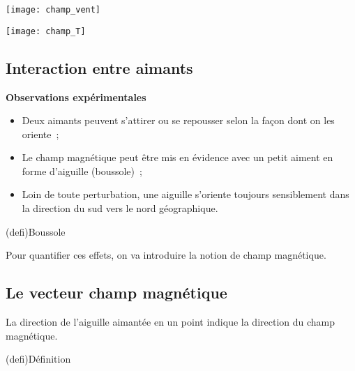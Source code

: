 \documentclass[../../main/main.tex]{subfiles}
\begin{document}
\noindent
\begin{minipage}[t]{.5\linewidth}
	\centering
	\texttt{[image: champ\_vent]}
	\label{fig:chpvent}
\end{minipage}
\hfill
\begin{minipage}[t]{.5\linewidth}
	\centering
	\texttt{[image: champ\_T]}
	\label{fig:chpT}
\end{minipage}

\subsection{Interaction entre aimants}
\textbf{Observations expérimentales}
\begin{itemize}
	\item Deux aimants peuvent s'attirer ou se repousser selon la façon dont on
	      les oriente~;
	\item Le champ magnétique peut être mis en évidence avec un petit aiment en
	      forme d'aiguille (boussole)~;
	\item Loin de toute perturbation, une aiguille s'oriente toujours sensiblement
	      dans la direction du sud vers le nord géographique.
\end{itemize}
\begin{tcb}(defi){Boussole}
	\begin{center}
	\end{center}
\end{tcb}
Pour quantifier ces effets, on va introduire la notion de champ magnétique.

\subsection{Le vecteur champ magnétique}
La direction de l'aiguille aimantée en un point indique la direction du champ
magnétique.
\begin{tcb}(defi){Définition}
\end{tcb}
\end{document}

